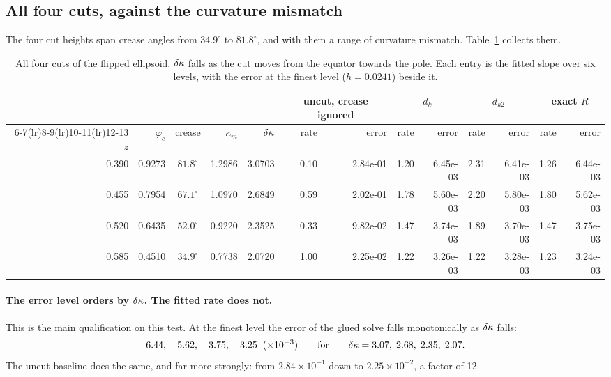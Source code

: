 \subsection{All four cuts, against the curvature mismatch}
\label{sec:dkappa}



The four cut heights span crease angles from $34.9^\circ$ to
$81.8^\circ$, and with them a range of curvature mismatch.
Table~\ref{tab:fourcuts} collects them.

\begin{table}[htbp]
\centering
\caption{All four cuts of the flipped ellipsoid. $\delta\kappa$ falls as the cut
  moves from the equator towards the pole. Each entry is the fitted
  slope over six levels, with the error at the finest level
  ($h=0.0241$) beside it.}
\label{tab:fourcuts}
\footnotesize
\setlength{\tabcolsep}{4pt}
\begin{tabular}{@{}rrcrr rr rr rr rr@{}}
\toprule
 & & & &
 & \multicolumn{2}{c}{uncut, crease ignored}
 & \multicolumn{2}{c}{$d_k$}
 & \multicolumn{2}{c}{$d_{k2}$}
 & \multicolumn{2}{c}{exact $R$} \\
\cmidrule(lr){6-7}\cmidrule(lr){8-9}\cmidrule(lr){10-11}\cmidrule(lr){12-13}
$z$ & $\varphi_c$ & crease & $\kappa_m$ & $\delta\kappa$
 & rate & error & rate & error & rate & error & rate & error \\
\midrule
0.390 & 0.9273 & $81.8^\circ$ & 1.2986 & 3.0703
 & 0.10 & 2.84e-01 & 1.20 & 6.45e-03 & 2.31 & 6.41e-03 & 1.26 & 6.44e-03 \\
0.455 & 0.7954 & $67.1^\circ$ & 1.0970 & 2.6849
 & 0.59 & 2.02e-01 & 1.78 & 5.60e-03 & 2.20 & 5.80e-03 & 1.80 & 5.62e-03 \\
0.520 & 0.6435 & $52.0^\circ$ & 0.9220 & 2.3525
 & 0.33 & 9.82e-02 & 1.47 & 3.74e-03 & 1.89 & 3.70e-03 & 1.47 & 3.75e-03 \\
0.585 & 0.4510 & $34.9^\circ$ & 0.7738 & 2.0720
 & 1.00 & 2.25e-02 & 1.22 & 3.26e-03 & 1.22 & 3.28e-03 & 1.23 & 3.24e-03 \\
\bottomrule
\end{tabular}
\end{table}

\paragraph{The error level orders by $\delta\kappa$. The fitted rate does not.}
This is the main qualification on this test. At the finest level the
error of the glued solve falls monotonically as $\delta\kappa$ falls:
\begin{equation*}
  6.44,\quad 5.62,\quad 3.75,\quad 3.25 \;\;(\times 10^{-3})
  \qquad\text{for}\qquad
  \delta\kappa = 3.07,\; 2.68,\; 2.35,\; 2.07 .
\end{equation*}
The uncut baseline does the same, and far more strongly: from
$2.84\times10^{-1}$ down to $2.25\times10^{-2}$, a factor of 12.

